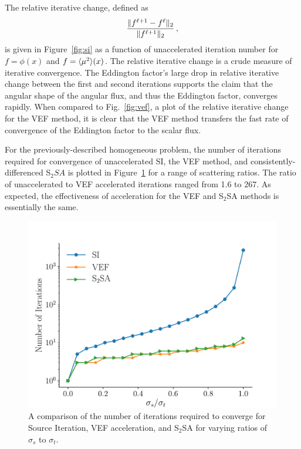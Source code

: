 The relative iterative change, defined as 
	\begin{equation}
		\frac{\| f^{\ell+1} - f^\ell \|_2}{\| f^{\ell+1} \|_2 } \,,
	\end{equation}	
is given in Figure~\ref{fig:si} as a function of unaccelerated iteration number for $f = \phi(x)$ and $f = \langle \mu^2 \rangle(x)$. The relative iterative change is a crude measure of iterative convergence.  The Eddington factor's large drop in relative 
iterative change between the first and second iterations supports the claim that the angular shape of the angular flux, and thus the Eddington factor, converges rapidly. When compared to Fig.~\ref{fig:vef}, a plot of the relative iterative change for the VEF method, it is clear that the VEF method transfers the fast rate of convergence of the Eddington factor to the scalar flux. 



For the previously-described homogeneous problem, the number of iterations required for convergence of unaccelerated SI, the VEF method, and consistently-differenced S$_2SA$ is plotted in Figure~\ref{fig:si_vef_s2sa} for a range of scattering ratios. The ratio of unaccelerated to VEF accelerated iterations ranged from 1.6 to 267.  As expected, the effectiveness of acceleration for the VEF and S$_2$SA methods is essentially the same. 

	\begin{figure}[htb]
		\centering
		\includegraphics[width=.75\textwidth]{figs/acceleration.pdf} 
		\caption{A comparison of the number of iterations required to converge for Source Iteration, VEF acceleration, and S$_2$SA for varying ratios of $\sigma_s$ to $\sigma_t$. } 
		\label{fig:si_vef_s2sa}
	\end{figure}


